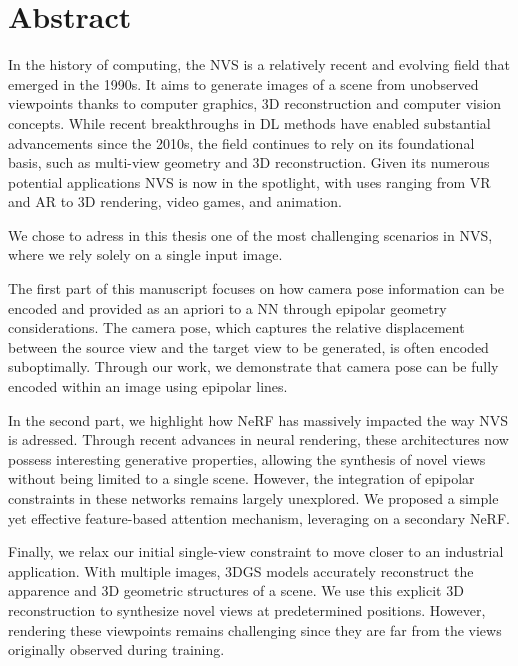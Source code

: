 \cleardoublepage
\setcounter{page}{1}

\chapter{Abstract}
In the history of computing, the \ac{NVS} is a relatively recent and evolving field that emerged in the 1990s. It aims to generate images of a scene from unobserved viewpoints thanks to computer graphics, 3D reconstruction and computer vision concepts. While recent breakthroughs in \ac{DL} methods have enabled substantial advancements since the 2010s, the field continues to rely on its foundational basis, such as multi-view geometry and 3D reconstruction. Given its numerous potential applications \ac{NVS} is now in the spotlight, with uses ranging from \ac{VR} and \ac{AR} to 3D rendering, video games, and animation.

We chose to adress in this thesis one of the most challenging scenarios in \ac{NVS}, where we rely solely on a single input image. 

The first part of this manuscript focuses on how camera pose information can be encoded and provided as an apriori to a \ac{NN} through epipolar geometry considerations. The camera pose, which captures the relative displacement between the source view and the target view to be generated, is often encoded suboptimally. Through our work, we demonstrate that camera pose can be fully encoded within an image using epipolar lines. 

In the second part, we highlight how \ac{NeRF} has massively impacted the way \ac{NVS} is adressed. Through recent advances in neural rendering, these architectures now possess interesting generative properties, allowing the synthesis of novel views without being limited to a single scene. However, the integration of epipolar constraints in these networks remains largely unexplored. We proposed a simple yet effective feature-based attention mechanism, leveraging on a secondary \ac{NeRF}. 

Finally, we relax our initial single-view constraint to move closer to an industrial application. With multiple images, 3D\ac{GS} models accurately reconstruct the apparence and 3D geometric structures of a scene. We use this explicit 3D reconstruction to synthesize novel views at predetermined positions. However, rendering these viewpoints remains challenging since they are far from the views originally observed during training. 

\cleardoublepage


